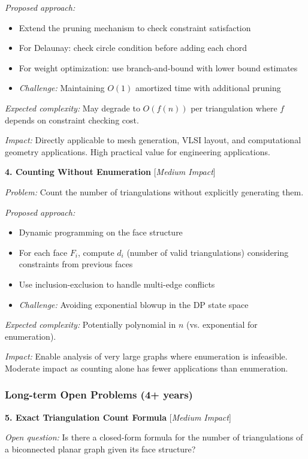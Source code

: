 \documentclass[12pt,a4paper]{article}
\theoremstyle{definition}
\theoremstyle{remark}
\begin{document}
\textit{Proposed approach:}
\begin{itemize}
\item Extend the pruning mechanism to check constraint satisfaction
\item For Delaunay: check circle condition before adding each chord
\item For weight optimization: use branch-and-bound with lower bound estimates
\item \textit{Challenge:} Maintaining $O(1)$ amortized time with additional pruning
\end{itemize}

\textit{Expected complexity:} May degrade to $O(f(n))$ per triangulation where $f$ depends on constraint checking cost.

\textit{Impact:} Directly applicable to mesh generation, VLSI layout, and computational geometry applications. High practical value for engineering applications.

\textbf{4. Counting Without Enumeration} [\textit{Medium Impact}]

\textit{Problem:} Count the number of triangulations without explicitly generating them.

\textit{Proposed approach:}
\begin{itemize}
\item Dynamic programming on the face structure
\item For each face $F_i$, compute $d_i$ (number of valid triangulations) considering constraints from previous faces
\item Use inclusion-exclusion to handle multi-edge conflicts
\item \textit{Challenge:} Avoiding exponential blowup in the DP state space
\end{itemize}

\textit{Expected complexity:} Potentially polynomial in $n$ (vs. exponential for enumeration).

\textit{Impact:} Enable analysis of very large graphs where enumeration is infeasible. Moderate impact as counting alone has fewer applications than enumeration.

\subsubsection{Long-term Open Problems (4+ years)}

\textbf{5. Exact Triangulation Count Formula} [\textit{Medium Impact}]

\textit{Open question:} Is there a closed-form formula for the number of triangulations of a biconnected planar graph given its face structure?
\end{document}
